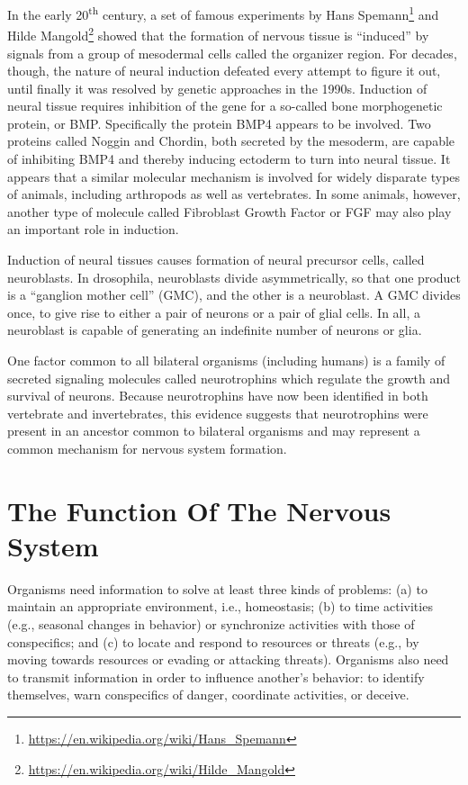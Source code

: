 \documentclass[]{book}
\let\rmarkdownfootnote\footnote%
\def\footnote{\protect\rmarkdownfootnote}
\renewcommand{\href}[2]{#2\footnote{\url{#1}}}
\begin{document}
In the early 20\textsuperscript{th} century, a set of famous experiments by \href{https://en.wikipedia.org/wiki/Hans_Spemann}{Hans Spemann} and \href{https://en.wikipedia.org/wiki/Hilde_Mangold}{Hilde Mangold} showed that the formation of nervous tissue is ``induced'' by signals from a group of mesodermal cells called the organizer region. For decades, though, the nature of neural induction defeated every attempt to figure it out, until finally it was resolved by genetic approaches in the 1990s. Induction of neural tissue requires inhibition of the gene for a so-called bone morphogenetic protein, or BMP. Specifically the protein BMP4 appears to be involved. Two proteins called Noggin and Chordin, both secreted by the mesoderm, are capable of inhibiting BMP4 and thereby inducing ectoderm to turn into neural tissue. It appears that a similar molecular mechanism is involved for widely disparate types of animals, including arthropods as well as vertebrates. In some animals, however, another type of molecule called Fibroblast Growth Factor or FGF may also play an important role in induction.

Induction of neural tissues causes formation of neural precursor cells, called neuroblasts. In drosophila, neuroblasts divide asymmetrically, so that one product is a ``ganglion mother cell'' (GMC), and the other is a neuroblast. A GMC divides once, to give rise to either a pair of neurons or a pair of glial cells. In all, a neuroblast is capable of generating an indefinite number of neurons or glia.

One factor common to all bilateral organisms (including humans) is a family of secreted signaling molecules called neurotrophins which regulate the growth and survival of neurons. Because neurotrophins have now been identified in both vertebrate and invertebrates, this evidence suggests that neurotrophins were present in an ancestor common to bilateral organisms and may represent a common mechanism for nervous system formation.

\hypertarget{the-function-of-the-nervous-system}{%
\section{The Function Of The Nervous System}\label{the-function-of-the-nervous-system}}

Organisms need information to solve at least three kinds of problems: (a) to maintain an appropriate environment, i.e., homeostasis; (b) to time activities (e.g., seasonal changes in behavior) or synchronize activities with those of conspecifics; and (c) to locate and respond to resources or threats (e.g., by moving towards resources or evading or attacking threats). Organisms also need to transmit information in order to influence another's behavior: to identify themselves, warn conspecifics of danger, coordinate activities, or deceive.
\end{document}
